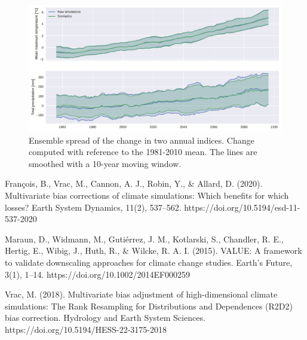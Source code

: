 \documentclass[letterpaper,10pt]{article}
\begin{document}
\begin{figure}
\centering
\includegraphics[width=\textwidth]{../images/ensemble_variability.pdf}
\caption{Ensemble spread of the change in two annual indices. Change computed with reference to the 1981-2010 mean. The lines are smoothed with a 10-year moving window.}\label{fig:ensvar}
\end{figure}

\begin{thebibliography}{6}
 François, B., Vrac, M., Cannon, A. J., Robin, Y., \& Allard, D. (2020). Multivariate bias corrections of climate simulations: Which benefits for which losses? Earth System Dynamics, 11(2), 537–562. https://doi.org/10.5194/esd-11-537-2020

 Maraun, D., Widmann, M., Gutiérrez, J. M., Kotlarski, S., Chandler, R. E., Hertig, E., Wibig, J., Huth, R., \& Wilcke, R. A. I. (2015). VALUE: A framework to validate downscaling approaches for climate change studies. Earth’s Future, 3(1), 1–14. https://doi.org/10.1002/2014EF000259

 Vrac, M. (2018). Multivariate bias adjustment of high-dimensional climate simulations: The Rank Resampling for Distributions and Dependences (R2D2) bias correction. Hydrology and Earth System Sciences. https://doi.org/10.5194/HESS-22-3175-2018
\end{thebibliography}
\end{document}
